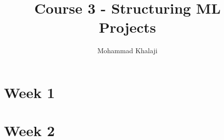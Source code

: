 \documentclass[10pt,a4paper]{article}
\author{Mohammad Khalaji}
\title{Course 3 - Structuring ML Projects}
\begin{document}
\maketitle
\section{Week 1}

\newpage
\section{Week 2}

\end{document}

